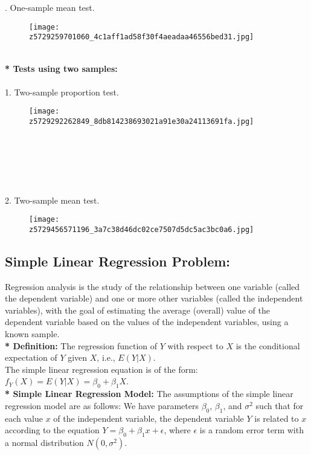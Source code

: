 \documentclass{article}
\begin{document}
	. One-sample mean test.\\
	\begin{figure}[!ht]
		\centering
		\texttt{[image: z5729259701060\_4c1aff1ad58f30f4aeadaa46556bed31.jpg]}
		
		\label{fig:enter-label}
	\end{figure}
	\\\textbf{* Tests using two samples:}\\\\
	1. Two-sample proportion test.\\
	\begin{figure}[!ht]
		\centering
		\texttt{[image: z5729292262849\_8db814238693021a91e30a24113691fa.jpg]}
		
		\label{fig:enter-label}
	\end{figure}\\\\\\\\\\
	2. Two-sample mean test.\\
	\begin{figure}[!ht]
		\centering
		\texttt{[image: z5729456571196\_3a7c38d46dc02ce7507d5dc5ac3bc0a6.jpg]}
		
		\label{fig:enter-label}
	\end{figure}
	\subsection{Simple Linear Regression Problem:}
	Regression analysis is the study of the relationship between one variable (called the dependent variable) and one or more other variables (called the independent variables), with the goal of estimating the average (overall) value of the dependent variable based on the values of the independent variables, using a known sample.\\
	
	\textbf{* Definition:} The regression function of \( Y \) with respect to \( X \) is the conditional expectation of \( Y \) given \( X \), i.e., \( E(Y|X) \). \\
	The simple linear regression equation is of the form: \( f_Y(X) = E(Y|X) = \beta_0 + \beta_1 X \).\\
	
	\textbf{* Simple Linear Regression Model:} The assumptions of the simple linear regression model are as follows: We have parameters \( \beta_0 \), \( \beta_1 \), and \( \sigma^2 \) such that for each value \( x \) of the independent variable, the dependent variable \( Y \) is related to \( x \) according to the equation \( Y = \beta_0 + \beta_1 x + \epsilon \), where \( \epsilon \) is a random error term with a normal distribution \( N(0, \sigma^2) \).
	
\end{document}
